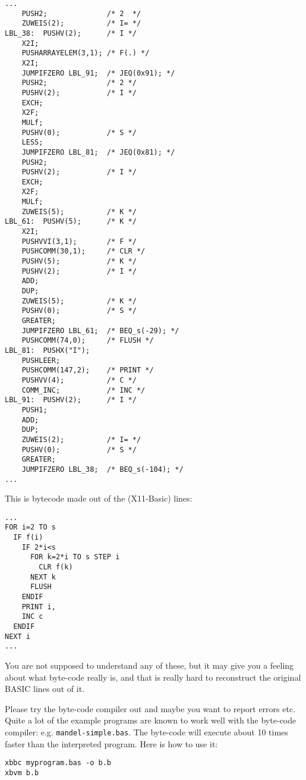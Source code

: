 \begin{mdframed}[hidealllines=true,backgroundcolor=green!20]
{\footnotesize
\begin{verbatim}
...
    PUSH2;              /* 2  */
    ZUWEIS(2);          /* I= */
LBL_38:  PUSHV(2);      /* I */
    X2I;
    PUSHARRAYELEM(3,1); /* F(.) */
    X2I;
    JUMPIFZERO LBL_91;	/* JEQ(0x91); */
    PUSH2;              /* 2 */
    PUSHV(2);           /* I */
    EXCH;
    X2F;
    MULf;
    PUSHV(0);           /* S */
    LESS;
    JUMPIFZERO LBL_81;	/* JEQ(0x81); */
    PUSH2;
    PUSHV(2);           /* I */
    EXCH;
    X2F;
    MULf;
    ZUWEIS(5);          /* K */
LBL_61:  PUSHV(5);      /* K */
    X2I;
    PUSHVVI(3,1);       /* F */
    PUSHCOMM(30,1);     /* CLR */
    PUSHV(5);           /* K */
    PUSHV(2);           /* I */
    ADD;
    DUP;
    ZUWEIS(5);          /* K */
    PUSHV(0);           /* S */
    GREATER;
    JUMPIFZERO LBL_61;	/* BEQ_s(-29); */
    PUSHCOMM(74,0);     /* FLUSH */
LBL_81:  PUSHX("I"); 
    PUSHLEER;
    PUSHCOMM(147,2);    /* PRINT */
    PUSHVV(4);          /* C */
    COMM_INC;           /* INC */
LBL_91:  PUSHV(2);      /* I */
    PUSH1;
    ADD;
    DUP;
    ZUWEIS(2);          /* I= */
    PUSHV(0);           /* S */
    GREATER;
    JUMPIFZERO LBL_38;  /* BEQ_s(-104); */
...
\end{verbatim}
}
\end{mdframed}
This is bytecode made out of the (X11-Basic) lines:
\begin{mdframed}[hidealllines=true,backgroundcolor=blue!20]
{\footnotesize
\begin{verbatim}
...
FOR i=2 TO s
  IF f(i)
    IF 2*i<s
      FOR k=2*i TO s STEP i
        CLR f(k)
      NEXT k
      FLUSH
    ENDIF
    PRINT i,
    INC c
  ENDIF
NEXT i
...
\end{verbatim}
}
\end{mdframed}

You are not supposed to understand any of these, but it may give you a 
feeling about what byte-code really is, and that is really hard to reconstruct
the original BASIC lines out of it.

Please try the byte-code compiler out and maybe you want to report errors etc.
Quite a lot of the example programs are known to work well with the byte-code
compiler:  e.g. \verb|mandel-simple.bas|. The byte-code will execute about 10
times faster than the interpreted program. Here is how to use it:

\begin{mdframed}[hidealllines=true,backgroundcolor=black!20]
\begin{verbatim}
xbbc myprogram.bas -o b.b
xbvm b.b
\end{verbatim}
\end{mdframed}

